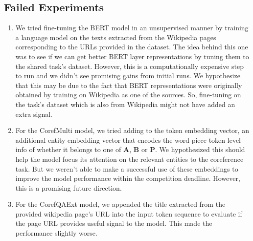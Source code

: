 \documentclass[11pt,a4paper]{article}
\begin{document}
\subsection{Failed Experiments}
\begin{enumerate}
\item We tried fine-tuning the BERT model in an unsupervised manner by training a language model on the texts extracted from the Wikipedia pages corresponding to the URLs provided in the dataset. The idea behind this one was to see if we can get better BERT layer representations by tuning them to the shared task's dataset. However, this is a computationally expensive step to run and we didn't see promising gains from initial runs. We  hypothesize that this may be due to the fact that BERT representations were originally obtained by training on Wikipedia as one of the sources. So, fine-tuning on the task's dataset which is also from Wikipedia might not have added an extra signal.
\item For the CorefMulti model, we tried adding to the token embedding vector, an additional entity embedding vector that encodes the word-piece token level info of whether it belongs to one of \textbf{A}, \textbf{B} or \textbf{P}. We hypothesized this should help the model focus its attention on the relevant entities to the coreference task. But we weren't able to make a successful use of these embeddings to improve the model performance within the competition deadline. However, this is a promising future direction. 
\item For the CorefQAExt model, we appended the title extracted from the provided wikipedia page's URL into the input token sequence to evaluate if the page URL provides useful signal to the model. This made the performance slightly worse.
\end{enumerate}
\end{document}
